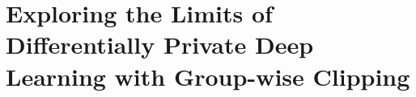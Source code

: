 \chapter[Exploring the Limits of Differentially Private Deep Learning \\with Group-wise Clipping]{\Large Exploring the Limits of Differentially Private Deep Learning with Group-wise Clipping}\label{ch_4}

% 





